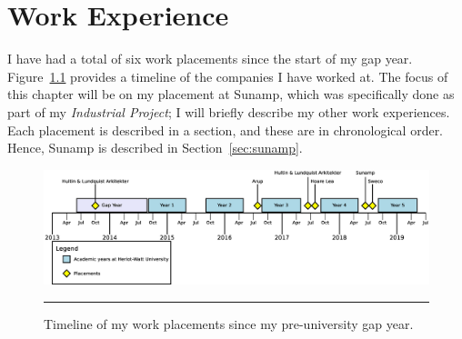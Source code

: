 \chapter{Work Experience} %

\label{Chapter2} %


I have had a total of six work placements since the start of my gap year.
Figure~\ref{timeline} provides a timeline of the companies I have worked at.
The focus of this chapter will be on my placement at Sunamp, which was specifically done as part of my \textit{Industrial Project}; I will briefly describe my other work experiences.
Each placement is described in a section, and these are in chronological order.
Hence, Sunamp is described in Section~\ref{sec:sunamp}.

\begin{figure}[htbp]
	\centering
	\includegraphics[width=\textwidth]{figures/IP-Timeline.eps}
	\rule{\textwidth}{0.5pt} %
	\caption{Timeline of my work placements since my pre-university gap year.}
	\label{timeline}
\end{figure}










